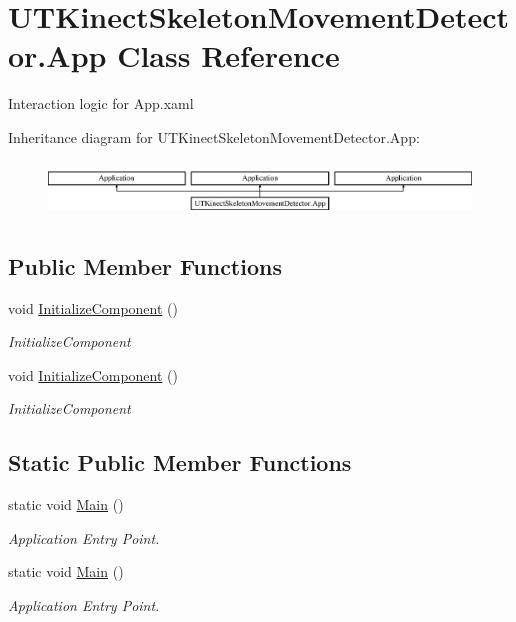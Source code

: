 \hypertarget{class_u_t_kinect_skeleton_movement_detector_1_1_app}{\section{U\-T\-Kinect\-Skeleton\-Movement\-Detector.\-App Class Reference}
\label{class_u_t_kinect_skeleton_movement_detector_1_1_app}
}


Interaction logic for App.\-xaml  


Inheritance diagram for U\-T\-Kinect\-Skeleton\-Movement\-Detector.\-App\-:\begin{figure}[H]
\begin{center}
\leavevmode
\includegraphics[height=1.487384cm]{class_u_t_kinect_skeleton_movement_detector_1_1_app}
\end{center}
\end{figure}
\subsection*{Public Member Functions}
\begin{DoxyCompactItemize}
\item 
void \hyperlink{class_u_t_kinect_skeleton_movement_detector_1_1_app_ad4f6df536dd24c00b8fdd75c73eb0988}{Initialize\-Component} ()
\begin{DoxyCompactList}\small\item\em Initialize\-Component \end{DoxyCompactList}\item 
void \hyperlink{class_u_t_kinect_skeleton_movement_detector_1_1_app_ad4f6df536dd24c00b8fdd75c73eb0988}{Initialize\-Component} ()
\begin{DoxyCompactList}\small\item\em Initialize\-Component \end{DoxyCompactList}\end{DoxyCompactItemize}
\subsection*{Static Public Member Functions}
\begin{DoxyCompactItemize}
\item 
static void \hyperlink{class_u_t_kinect_skeleton_movement_detector_1_1_app_acdb1c09f47bfad48eae6c3926122db28}{Main} ()
\begin{DoxyCompactList}\small\item\em Application Entry Point. \end{DoxyCompactList}\item 
static void \hyperlink{class_u_t_kinect_skeleton_movement_detector_1_1_app_acdb1c09f47bfad48eae6c3926122db28}{Main} ()
\begin{DoxyCompactList}\small\item\em Application Entry Point. \end{DoxyCompactList}\end{DoxyCompactItemize}


